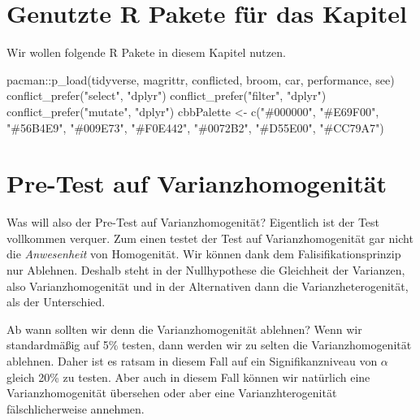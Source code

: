 \documentclass[
  letterpaper,
]{scrbook}
\newenvironment{Shaded}{\begin{snugshade}}{\end{snugshade}}
\newcommand{\FunctionTok}[1]{\textcolor[rgb]{0.28,0.35,0.67}{#1}}
\newcommand{\NormalTok}[1]{\textcolor[rgb]{0.00,0.23,0.31}{#1}}
\newcommand{\OtherTok}[1]{\textcolor[rgb]{0.00,0.23,0.31}{#1}}
\newcommand{\SpecialCharTok}[1]{\textcolor[rgb]{0.37,0.37,0.37}{#1}}
\newcommand{\StringTok}[1]{\textcolor[rgb]{0.13,0.47,0.30}{#1}}
\begin{document}
\hypertarget{genutzte-r-pakete-fuxfcr-das-kapitel-13}{%
\section{Genutzte R Pakete für das
Kapitel}\label{genutzte-r-pakete-fuxfcr-das-kapitel-13}}

Wir wollen folgende R Pakete in diesem Kapitel nutzen.

\begin{Shaded}
\begin{Highlighting}[]
\NormalTok{pacman}\SpecialCharTok{::}\FunctionTok{p\_load}\NormalTok{(tidyverse, magrittr, conflicted,}
\NormalTok{               broom, car, performance, see)}
\FunctionTok{conflict\_prefer}\NormalTok{(}\StringTok{"select"}\NormalTok{, }\StringTok{"dplyr"}\NormalTok{)}
\FunctionTok{conflict\_prefer}\NormalTok{(}\StringTok{"filter"}\NormalTok{, }\StringTok{"dplyr"}\NormalTok{)}
\FunctionTok{conflict\_prefer}\NormalTok{(}\StringTok{"mutate"}\NormalTok{, }\StringTok{"dplyr"}\NormalTok{)}
\NormalTok{cbbPalette }\OtherTok{\textless{}{-}} \FunctionTok{c}\NormalTok{(}\StringTok{"\#000000"}\NormalTok{, }\StringTok{"\#E69F00"}\NormalTok{, }\StringTok{"\#56B4E9"}\NormalTok{, }\StringTok{"\#009E73"}\NormalTok{, }
                \StringTok{"\#F0E442"}\NormalTok{, }\StringTok{"\#0072B2"}\NormalTok{, }\StringTok{"\#D55E00"}\NormalTok{, }\StringTok{"\#CC79A7"}\NormalTok{)}
\end{Highlighting}
\end{Shaded}

\hypertarget{pre-test-auf-varianzhomogenituxe4t}{%
\section{Pre-Test auf
Varianzhomogenität}\label{pre-test-auf-varianzhomogenituxe4t}}

Was will also der Pre-Test auf Varianzhomogenität? Eigentlich ist der
Test vollkommen verquer. Zum einen testet der Test auf
Varianzhomogenität gar nicht die \emph{Anwesenheit} von Homogenität. Wir
können dank dem Falisifikationsprinzip nur Ablehnen. Deshalb steht in
der Nullhypothese die Gleichheit der Varianzen, also Varianzhomogenität
und in der Alternativen dann die Varianzheterogenität, als der
Unterschied.

Ab wann sollten wir denn die Varianzhomogenität ablehnen? Wenn wir
standardmäßig auf 5\% testen, dann werden wir zu selten die
Varianzhomogenität ablehnen. Daher ist es ratsam in diesem Fall auf ein
Signifikanzniveau von \(\alpha\) gleich 20\% zu testen. Aber auch in
diesem Fall können wir natürlich eine Varianzhomogenität übersehen oder
aber eine Varianzhterogenität fälschlicherweise annehmen.
\end{document}
